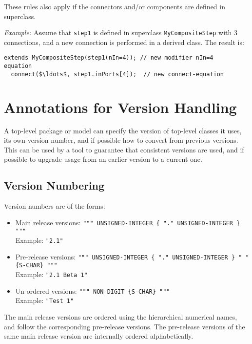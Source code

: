 \begin{nonnormative}
These rules also apply if the connectors and/or components are defined in superclass.

\emph{Example:} Assume that \lstinline!step1! is defined in superclass \lstinline!MyCompositeStep! with 3 connections, and a new connection is performed in a derived class.
The result is:
\begin{lstlisting}[language=modelica]
  extends MyCompositeStep(step1(nIn=4)); // new modifier nIn=4
equation
  connect($\ldots$, step1.inPorts[4]);  // new connect-equation
\end{lstlisting}
\end{nonnormative}

\section{Annotations for Version Handling}\label{annotations-for-version-handling}

A top-level package or model can specify the version of top-level
classes it uses, its own version number, and if possible how to convert
from previous versions. This can be used by a tool to guarantee that
consistent versions are used, and if possible to upgrade usage from an
earlier version to a current one.

\subsection{Version Numbering}\label{version-numbering}

Version numbers are of the forms:
\begin{itemize}
\item
  Main release versions: \lstinline[language=grammar]!""" UNSIGNED-INTEGER { "." UNSIGNED-INTEGER } """!\\
  Example: \lstinline!"2.1"!
\item
  Pre-release versions: \lstinline[language=grammar]!""" UNSIGNED-INTEGER { "." UNSIGNED-INTEGER } " " {S-CHAR} """!\\
  Example: \lstinline!"2.1 Beta 1"!
\item
  Un-ordered versions: \lstinline[language=grammar]!""" NON-DIGIT {S-CHAR} """!\\
  Example: \lstinline!"Test 1"!
\end{itemize}

The main release versions are ordered using the hierarchical numerical
names, and follow the corresponding pre-release versions. The
pre-release versions of the same main release version are internally
ordered alphabetically.

